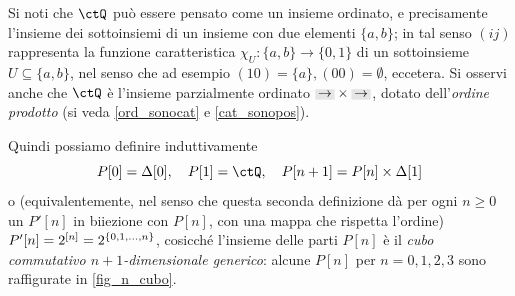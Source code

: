 \begin{remark}
 Si noti che \(\ctQ\) può essere pensato come un insieme ordinato, e precisamente l'insieme dei sottoinsiemi di un insieme con due elementi \(\{a,b\}\); in tal senso \((ij)\) rappresenta la funzione caratteristica \(\chi_U \colon \{a,b\}\to \{0,1\}\) di un sottoinsieme \(U\subseteq \{a,b\}\), nel senso che ad esempio \((10)=\{a\}, (00)=\emptyset\), eccetera. Si osservi anche che \(\ctQ\) è l'insieme parzialmente ordinato \(\genArrow\times \genArrow\), dotato dell'\emph{ordine prodotto} (si veda \ref{ord_sonocat} e \ref{cat_sonopos}).

 Quindi possiamo definire induttivamente
 \[P[0] = \Delta[0], \quad P[1] = \ctQ, \quad P[n+1] = P[n]\times \Delta[1]\]
 o (equivalentemente, nel senso che questa seconda definizione dà per ogni \(n\ge 0\) un \(P'[n]\) in biiezione con \(P[n]\), con una mappa che rispetta l'ordine) \(P'[n] = 2^{[n]} = 2^{\{0,1,\dots,n\}}\), cosicché l'insieme delle parti \(P[n]\) è il \emph{cubo commutativo \(n+1\)-dimensionale generico}: alcune \(P[n]\) per \(n=0,1,2,3\) sono raffigurate in \ref{fig_n_cubo}.
 \begin{figure}[h]
  \begin{center}
\end{center}
\end{figure}
\end{remark}
